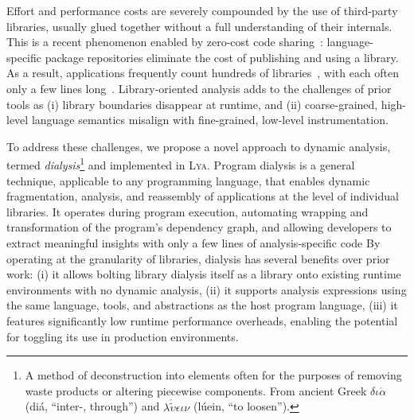 \documentclass[letterpaper,twocolumn,10pt]{article}
\newcommand{\sys}{{\scshape Lya}\xspace}
\begin{document}
Effort and performance costs are severely compounded by the use of third-party libraries, usually glued together without a full understanding of their internals.
This is a recent phenomenon enabled by zero-cost code sharing~\cite{libs}:
  language-specific package repositories eliminate the cost of publishing and using a library.
As a result, applications frequently count hundreds of libraries~\cite{npmstudy:19}, with each often only a few lines long~\cite{leftpad, npmstudy:19}. %
Library-oriented analysis adds to the challenges of prior tools as
  (i) library boundaries disappear at runtime, and
  (ii) coarse-grained, high-level language semantics misalign with fine-grained, low-level instrumentation.

To address these challenges, we propose a novel approach to dynamic analysis, termed \emph{dialysis}\footnote{
  A method of deconstruction into elements often for the purposes of removing waste products or altering piecewise components.
  From ancient Greek {\scriptsize $\delta\iota\acute{\alpha}$} (di\'{a}, ``inter-, through'') and {\scriptsize $\lambda\acute{\tilde{\upsilon}}\epsilon\iota\nu$} (lúein, ``to loosen'').
} and implemented in \sys.
Program dialysis is a general technique, applicable to any programming language, that enables dynamic fragmentation, analysis, and reassembly of applications at the level of individual libraries. 
It operates during program execution, automating wrapping and transformation of the program's dependency graph, and allowing developers to extract meaningful insights with only a few lines of analysis-specific code
By operating at the granularity of libraries, dialysis has several benefits over prior work: %
  (i) it allows bolting library dialysis itself as a library onto existing runtime environments with no dynamic analysis,
  (ii) it supports analysis expressions using the same language, tools, and abstractions as the host program language,
  (iii) it features significantly low runtime performance overheads, enabling the potential for toggling its use in production environments.
\end{document}
